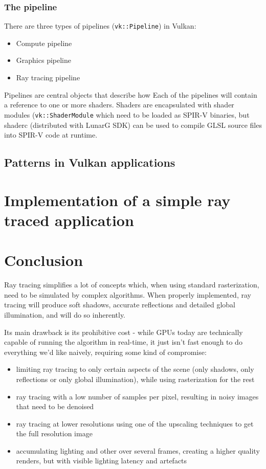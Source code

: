 \documentclass[times, utf8, zavrsni, numeric]{fer}
\begin{document}
\subsection{The pipeline}
There are three types of pipelines (\texttt{vk::Pipeline}) in Vulkan:
\begin{itemize}
	\item{Compute pipeline}
	\item{Graphics pipeline}
	\item{Ray tracing pipeline}
\end{itemize}

Pipelines are central objects that describe how 
Each of the pipelines will contain a reference to one or more shaders. Shaders are encapsulated with shader modules (\texttt{vk::ShaderModule} which need to be loaded as SPIR-V binaries, but shaderc (distributed with LunarG SDK) can be used to compile GLSL source files into SPIR-V code at runtime.

\section{Patterns in Vulkan applications}


\chapter{Implementation of a simple ray traced application}

\chapter{Conclusion}
Ray tracing simplifies a lot of concepts which, when using standard rasterization, need to be simulated by complex algorithms. When properly implemented, ray tracing will produce soft shadows, accurate reflections and detailed global illumination, and will do so inherently.

Its main drawback is its prohibitive cost - while GPUs today are technically capable of running the algorithm in real-time, it just isn't fast enough to do everything we'd like naively, requiring some kind of compromise:
\begin{itemize}
	\item limiting ray tracing to only certain aspects of the scene (only shadows, only reflections or only global illumination), while using rasterization for the rest
	\item ray tracing with a low number of samples per pixel, resulting in noisy images that need to be denoised
	\item ray tracing at lower resolutions using one of the upscaling techniques to get the full resolution image
	\item accumulating lighting and other over several frames, creating a higher quality renders, but with visible lighting latency and artefacts
\end{itemize}
\end{document}
